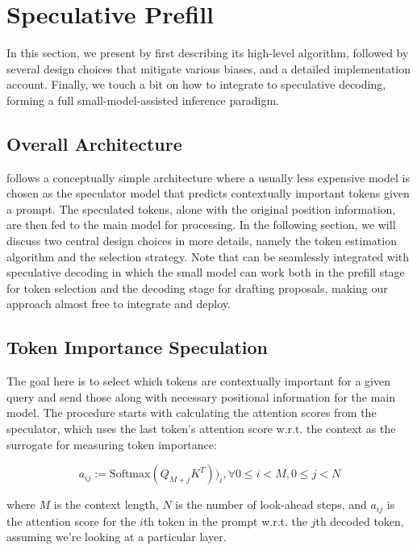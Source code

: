 \section{Speculative Prefill}
In this section, we present \ours{} by first describing its high-level algorithm, followed by several design choices that mitigate various biases, and a detailed implementation account. Finally, we touch a bit on how to integrate \ours{} to speculative decoding, forming a full small-model-assisted inference paradigm. 

\subsection{Overall Architecture}

\ours{} follows a conceptually simple architecture where a usually less expensive model is chosen as the speculator model that predicts contextually important tokens given a prompt. The speculated tokens, alone with the original position information, are then fed to the main model for processing. In the following section, we will discuss two central design choices in more details, namely the token estimation algorithm and the selection strategy. Note that \ours{} can be seamlessly integrated with speculative decoding in which the small model can work both in the prefill stage for token selection and the decoding stage for drafting proposals, making our approach almost free to integrate and deploy.  

\subsection{Token Importance Speculation}
\label{sec:token_importance}

The goal here is to select which tokens are contextually important for a given query and send those along with necessary positional information for the main model. The procedure starts with calculating the attention scores from the speculator, which uses the last token's attention score w.r.t. the context as the surrogate for measuring token importance:

\begin{equation*}
    a_{ij} := \text{Softmax}(Q_{M + j}K^T))_i, \forall 0\leq i < M, 0 \leq j < N
\end{equation*}

where $M$ is the context length, $N$ is the number of look-ahead steps, and $a_{ij}$ is the attention score for the $i$th token in the prompt w.r.t. the $j$th decoded token, assuming we're looking at a particular layer. 

